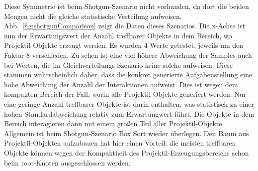 Diese Symmetrie ist beim Shotgun-Szenario nicht vorhanden, da dort die beiden Mengen nicht die gleiche statistische Verteilung aufweisen. Abb.~\ref{fig:shotgunComparison} zeigt die Daten dieses Szenarios. Die x-Achse ist nun der Erwartungswert der Anzahl treffbarer Objekte in dem Bereich, wo Projektil-Objekte erzeugt werden. Es wurden 4 Werte getestet, jeweils um den Faktor 8 verschieden. Zu sehen ist eine viel höhere Abweichung der Samples auch bei Werten, die im Gleichverteilungs-Szenario keine solche aufweisen. Diese stammen wahrscheinlich daher, dass die konkret generierte Aufgabenstellung eine hohe Abweichung der Anzahl der Interaktionen aufweist. Dies ist wegen dem kompakten Bereich der Fall, worin alle Projektil-Objekte generiert werden. Nur eine geringe Anzahl treffbarer Objekte ist darin enthalten, was statistisch zu einer hohen Standardabweichung relativ zum Erwartungwert führt. Die Objekte in dem Bereich interagieren dann mit einem großen Teil aller Projektil-Objekte.\\
Allgemein ist beim Shotgun-Szenario Box Sort wieder überlegen. Den Baum aus Projektil-Objekten aufzubauen hat hier einen Vorteil: die meisten treffbaren Objekte können wegen der Kompaktheit des Projektil-Erzeugungsbereichs schon beim root-Knoten ausgeschlossen werden.\\

